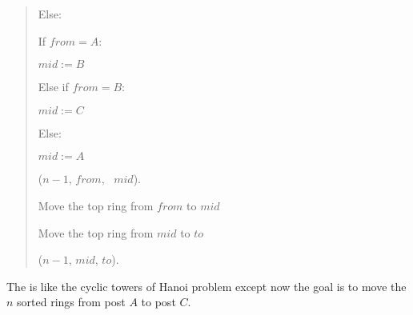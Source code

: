 \documentclass[10pt]{article}
\begin{document}
\begin{solution}
\begin{quote}
\begin{steps}
      \item Else: 
        \begin{steps}
        \item If \(from = A\):
          \begin{steps}
          \item \(mid := B\)
          \end{steps}
        \item Else if \(from = B\):
          \begin{steps}
          \item \(mid := C\)
          \end{steps}
        \item Else:
          \begin{steps}
          \item \(mid := A\)
          \end{steps}

        \item {}($n - 1$, $from$, \ $mid$).

        \item Move the top ring from $from$ to $mid$

        \item Move the top ring from $mid$ to $to$

        \item {}($n - 1$, $mid$, $to$).
        \end{steps}
  \end{steps}
\end{quote}
\end{solution}
\pagebreak

The  is like the cyclic towers of Hanoi problem except now the goal is to move the $n$ sorted rings from post $A$ to post $C$.
\end{document}
